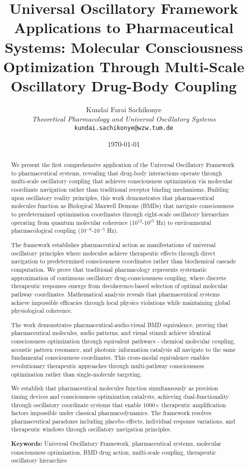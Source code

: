 \documentclass[12pt,a4paper]{article}
\title{\textbf{Universal Oscillatory Framework Applications to Pharmaceutical Systems: Molecular Consciousness Optimization Through Multi-Scale Oscillatory Drug-Body Coupling}}
\author{
Kundai Farai Sachikonye\\
\textit{Theoretical Pharmacology and Universal Oscillatory Systems}\\
\texttt{kundai.sachikonye@wzw.tum.de}
}
\date{\today}
\begin{document}
\maketitle

\begin{abstract}
We present the first comprehensive application of the Universal Oscillatory Framework to pharmaceutical systems, revealing that drug-body interactions operate through multi-scale oscillatory coupling that achieves consciousness optimization via molecular coordinate navigation rather than traditional receptor binding mechanisms. Building upon oscillatory reality principles, this work demonstrates that pharmaceutical molecules function as Biological Maxwell Demons (BMDs) that navigate consciousness to predetermined optimization coordinates through eight-scale oscillatory hierarchies operating from quantum molecular coherence (10$^{12}$-10$^{15}$ Hz) to environmental pharmacological coupling (10$^{-8}$-10$^{-5}$ Hz).

The framework establishes pharmaceutical action as manifestations of universal oscillatory principles where molecules achieve therapeutic effects through direct navigation to predetermined consciousness coordinates rather than biochemical cascade computation. We prove that traditional pharmacology represents systematic approximation of continuous oscillatory drug-consciousness coupling, where discrete therapeutic responses emerge from decoherence-based selection of optimal molecular pathway coordinates. Mathematical analysis reveals that pharmaceutical systems achieve impossible efficacies through local physics violations while maintaining global physiological coherence.

The work demonstrates pharmaceutical-audio-visual BMD equivalence, proving that pharmaceutical molecules, audio patterns, and visual stimuli achieve identical consciousness optimization through equivalent pathways - chemical molecular coupling, acoustic pattern resonance, and photonic information catalysis all navigate to the same fundamental consciousness coordinates. This cross-modal equivalence enables revolutionary therapeutic approaches through multi-pathway consciousness optimization rather than single-molecule targeting.

We establish that pharmaceutical molecules function simultaneously as precision timing devices and consciousness optimization catalysts, achieving dual-functionality through oscillatory coordinate systems that enable 1000× therapeutic amplification factors impossible under classical pharmacodynamics. The framework resolves pharmaceutical paradoxes including placebo effects, individual response variations, and therapeutic windows through oscillatory navigation principles.

\textbf{Keywords:} Universal Oscillatory Framework, pharmaceutical systems, molecular consciousness optimization, BMD drug action, multi-scale coupling, therapeutic oscillatory hierarchies
\end{abstract}
\end{document}
